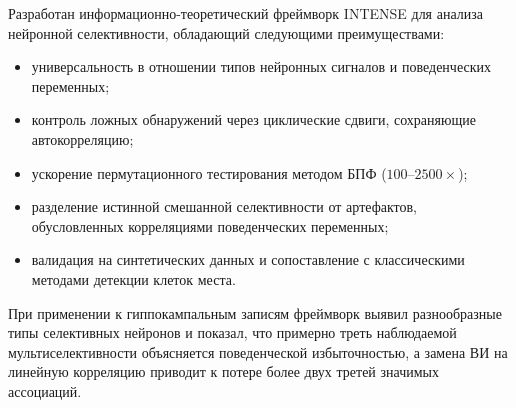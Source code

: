 Разработан информационно-теоретический фреймворк INTENSE для анализа нейронной селективности, обладающий следующими преимуществами:
\begin{itemize}
    \item универсальность в отношении типов нейронных сигналов и поведенческих переменных;
    \item контроль ложных обнаружений через циклические сдвиги, сохраняющие автокорреляцию;
    \item ускорение пермутационного тестирования методом БПФ ($100$--$2500\times$);
    \item разделение истинной смешанной селективности от артефактов, обусловленных корреляциями поведенческих переменных;
    \item валидация на синтетических данных и сопоставление с классическими методами детекции клеток места.
\end{itemize}

При применении к гиппокампальным записям фреймворк выявил разнообразные типы селективных нейронов и показал, что примерно треть наблюдаемой мультиселективности объясняется поведенческой избыточностью, а замена ВИ на линейную корреляцию приводит к потере более двух третей значимых ассоциаций.
